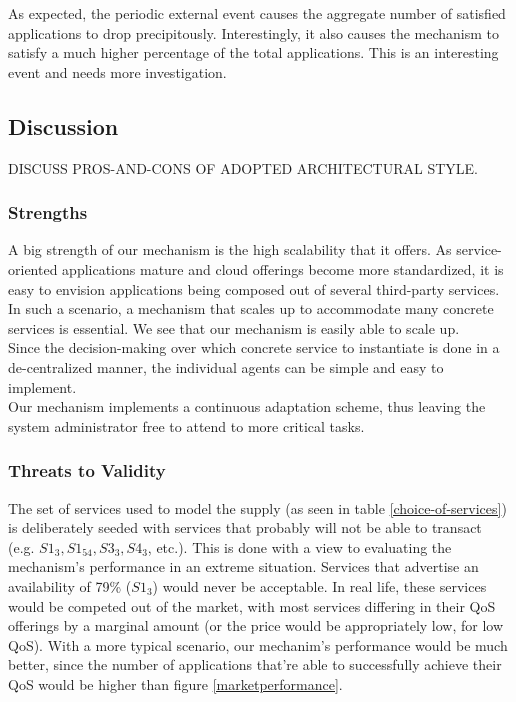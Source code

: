 \documentclass[10pt,journal,compsoc]{IEEEtran}
\begin{document}
As expected, the periodic external event causes the aggregate number of satisfied applications to drop precipitously. Interestingly, it also causes the mechanism to satisfy a much higher percentage of the total applications. This is an interesting event and needs more investigation.

\subsection{Discussion}
DISCUSS PROS-AND-CONS OF ADOPTED ARCHITECTURAL STYLE. 
\subsubsection{Strengths}
A big strength of our mechanism is the high scalability that it offers. As service-oriented applications mature and cloud offerings become more standardized, it is easy to envision applications being composed out of several third-party services. In such a scenario, a mechanism that scales up to accommodate many concrete services is essential. We see that our mechanism is easily able to scale up.\\
Since the decision-making over which concrete service to instantiate is done in a de-centralized manner, the individual agents can be simple and easy to implement. \\    
Our mechanism implements a continuous adaptation scheme, thus leaving the system administrator free to attend to more critical tasks.

\subsubsection{Threats to Validity}

The set of services used to model the supply (as seen in table \ref{choice-of-services}) is deliberately seeded with services that probably will not be able to transact (e.g. $S1_{3}, S1_{54}, S3_{3}, S4_{3}$, etc.). This is done with a view to evaluating the mechanism's performance in an extreme situation. Services that advertise an availability of 79\% ($S1_{3}$) would never be acceptable.  In real life, these services would be competed out of the market, with most services differing in their QoS offerings by a marginal amount (or the price would be appropriately low, for low QoS). With a more typical scenario, our mechanim's performance would be much better, since the number of applications that're able to successfully achieve their QoS would be higher than figure \ref{marketperformance}.
\end{document}
